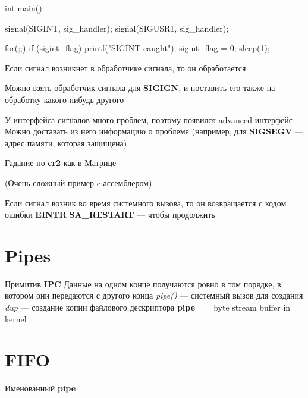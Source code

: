 int main() {
    signal(SIGINT, sig_handler);
    signal(SIGUSR1, sig_handler);

    for(;;) {
        if (sigint_flag) {
            printf("SIGINT caught\n");
            sigint_flag = 0;
        }
        sleep(1);
    }
}
Если сигнал возникнет в обработчике сигнала, то он обработается

Можно взять обработчик сигнала для \textbf{SIGIGN}, и поставить его также на обработку какого-нибудь другого

У интерфейса сигналов много проблем, поэтому появился advanced интерфейс 
Можно доставать из него информацию о проблеме (например, для \textbf{SIGSEGV} --- адрес памяти, которая защищена)

Гадание по \textbf{cr2} как в Матрице


(Очень сложный пример c ассемблером)


Если сигнал возник во время системного вызова, то он возвращается с кодом ошибки \textbf{EINTR}
\textbf{SA_RESTART} --- чтобы продолжить


\section{Pipes}
Примитив \textbf{IPC}
Данные на одном конце получаются ровно в том порядке, в котором они передаются с другого конца
\emph{pipe()} --- системный вызов для создания
\emph{dup} --- создание копии файлового дескриптора
\textbf{pipe} == byte stream buffer in kernel

\section{FIFO}
Именованный \textbf{pipe}
